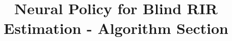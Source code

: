 \documentclass[conference]{IEEEtran}
\begin{document}
\title{Neural Policy for Blind RIR Estimation - Algorithm Section}

\maketitle


\end{document}
